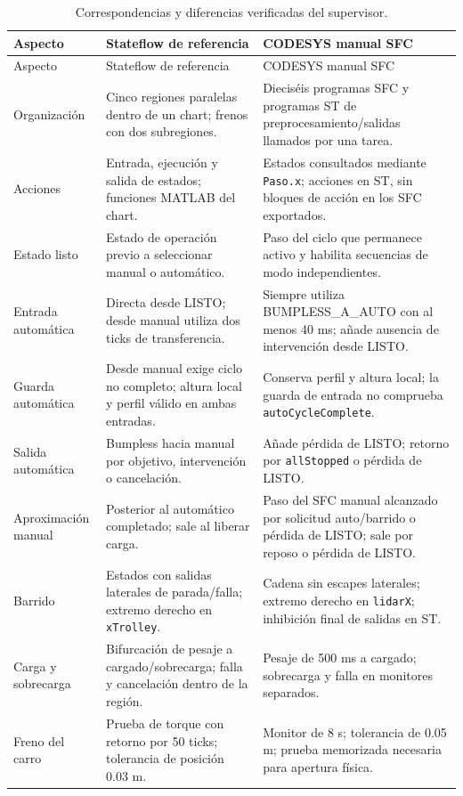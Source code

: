 \documentclass[a4paper,10pt,onecolumn,journal]{ieeeconf}
\numberwithin{equation}{section}
\begin{document}
{\footnotesize
{}
\begin{longtable}{L{3.0cm} L{5.8cm} L{5.8cm}}
\caption{Correspondencias y diferencias verificadas del supervisor.}\label{tab:comparacion_sup_sfc}\\
\toprule
Aspecto & Stateflow de referencia & CODESYS manual SFC\\
\midrule
\endfirsthead
\toprule Aspecto & Stateflow de referencia & CODESYS manual SFC\\\midrule
\endhead
Organización & Cinco regiones paralelas dentro de un chart; frenos con dos subregiones. & Dieciséis programas SFC y programas ST de preprocesamiento/salidas llamados por una tarea.\\
Acciones & Entrada, ejecución y salida de estados; funciones MATLAB del chart. & Estados consultados mediante \texttt{Paso.x}; acciones en ST, sin bloques de acción en los SFC exportados.\\
Estado listo & Estado de operación previo a seleccionar manual o automático. & Paso del ciclo que permanece activo y habilita secuencias de modo independientes.\\
Entrada automática & Directa desde LISTO; desde manual utiliza dos ticks de transferencia. & Siempre utiliza BUMPLESS\_A\_AUTO con al menos 40 ms; añade ausencia de intervención desde LISTO.\\
Guarda automática & Desde manual exige ciclo no completo; altura local y perfil válido en ambas entradas. & Conserva perfil y altura local; la guarda de entrada no comprueba \texttt{autoCycleComplete}.\\
Salida automática & Bumpless hacia manual por objetivo, intervención o cancelación. & Añade pérdida de LISTO; retorno por \texttt{allStopped} o pérdida de LISTO.\\
Aproximación manual & Posterior al automático completado; sale al liberar carga. & Paso del SFC manual alcanzado por solicitud auto/barrido o pérdida de LISTO; sale por reposo o pérdida de LISTO.\\
Barrido & Estados con salidas laterales de parada/falla; extremo derecho en \texttt{xTrolley}. & Cadena sin escapes laterales; extremo derecho en \texttt{lidarX}; inhibición final de salidas en ST.\\
Carga y sobrecarga & Bifurcación de pesaje a cargado/sobrecarga; falla y cancelación dentro de la región. & Pesaje de 500 ms a cargado; sobrecarga y falla en monitores separados.\\
Freno del carro & Prueba de torque con retorno por 50 ticks; tolerancia de posición 0.03 m. & Monitor de 8 s; tolerancia de 0.05 m; prueba memorizada necesaria para apertura física.\\

\end{longtable}}
\end{document}
